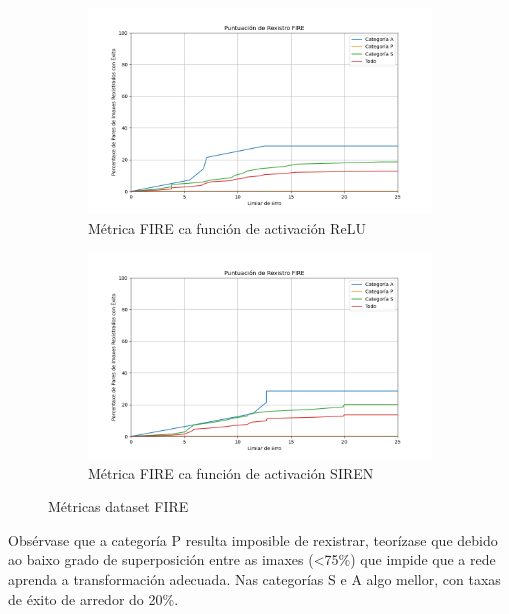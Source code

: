 \begin{figure}[ht]
    \centering
    \begin{subfigure}[b]{0.5\textwidth}
        \centering
        \includegraphics[width=\textwidth]{imaxes/FIRE_scores/fire_registration_score_ReLU.png}
        \caption{Métrica FIRE ca función de activación ReLU}
        \label{fig:FIRE_relu}
    \end{subfigure}\hfill
    \begin{subfigure}[b]{0.5\textwidth}
        \centering
        \includegraphics[width=\textwidth]{imaxes/FIRE_scores/fire_registration_scores_SIREN.png}
        \caption{Métrica FIRE ca función de activación SIREN}
        \label{fig:FIRE_SIREN}
    \end{subfigure}
    \caption{Métricas dataset FIRE}
    \label{fig:FIRE_scores}
\end{figure}

Obsérvase que a categoría P resulta imposible de rexistrar, teorízase que debido ao baixo grado de superposición entre as imaxes (<75\%) que impide que a rede aprenda a transformación adecuada.
Nas categorías S e A algo mellor, con taxas de éxito de arredor do 20\%. 

